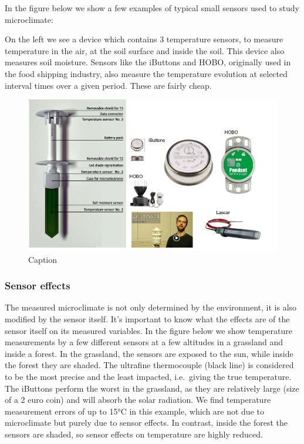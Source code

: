\documentclass[12pt,oneside]{book}
\begin{document}
In the figure below we show a few examples of typical small sensors used
to study microclimate:

On the left we see a device which contains 3 temperature sensors, to
measure temperature in the air, at the soil surface and inside the soil.
This device also measures soil moisture. Sensors like the iButtons and
HOBO, originally used in the food shipping industry, also measure the
temperature evolution at selected interval times over a given period.
These are fairly cheap.

\begin{figure}

{\centering \includegraphics[width=0.8\linewidth]{figures/Figure108} 

}

\caption{Caption}\label{fig:Micro8}
\end{figure}

\subsubsection{Sensor effects}\label{sensor-effects}

The measured microclimate is not only determined by the environment, it
is also modified by the sensor itself. It's important to know what the
effects are of the sensor itself on its measured variables. In the
figure below we show temperature measurements by a few different sensors
at a few altitudes in a grassland and inside a forest. In the grassland,
the sensors are exposed to the sun, while inside the forest they are
shaded. The ultrafine thermocouple (black line) is considered to be the
most precise and the least impacted, i.e.~giving the true temperature.
The iButtons perform the worst in the grassland, as they are relatively
large (size of a 2 euro coin) and will absorb the solar radiation. We
find temperature measurement errors of up to 15°C in this example, which
are not due to microclimate but purely due to sensor effects. In
contrast, inside the forest the sensors are shaded, so sensor effects on
temperature are highly reduced.
\end{document}

